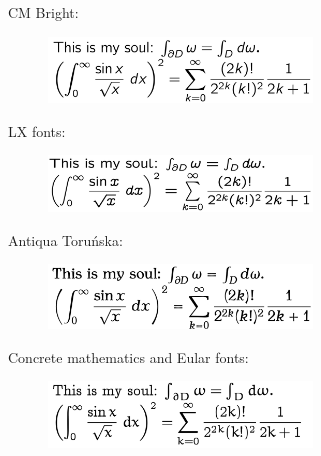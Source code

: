 \documentclass[uplatex, 12pt, dvipdfmx, twocolumn]{jsarticle}
\begin{document}
CM Bright:
\begin{figure}[h]\centering
    \includegraphics[width=7cm]{cmb.png}
\end{figure}

LX fonts:
\begin{figure}[h]\centering
    \includegraphics[width=7cm]{lx.png}
\end{figure}

Antiqua Toru\'{n}ska:
\begin{figure}[h]\centering
    \includegraphics[width=7cm]{anttor.png}
\end{figure}

Concrete mathematics and Eular fonts:
\begin{figure}[h]\centering
    \includegraphics[width=7cm]{CMEULAR.png}
\end{figure}
\end{document}
